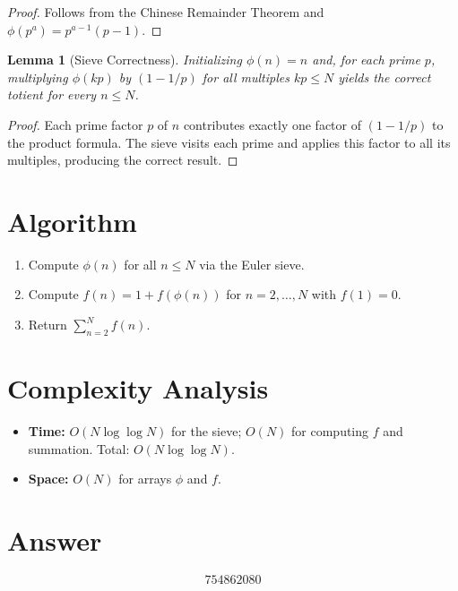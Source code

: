 \documentclass[11pt]{article}
\newtheorem{lemma}[theorem]{Lemma}
\begin{document}
\begin{proof}
Follows from the Chinese Remainder Theorem and $\phi(p^a) = p^{a-1}(p-1)$.
\end{proof}

\begin{lemma}[Sieve Correctness]
Initializing $\phi(n) = n$ and, for each prime $p$, multiplying $\phi(kp)$ by $(1 - 1/p)$ for all multiples $kp \leq N$ yields the correct totient for every $n \leq N$.
\end{lemma}

\begin{proof}
Each prime factor $p$ of $n$ contributes exactly one factor of $(1 - 1/p)$ to the product formula. The sieve visits each prime and applies this factor to all its multiples, producing the correct result.
\end{proof}

\section{Algorithm}
\begin{enumerate}
    \item Compute $\phi(n)$ for all $n \leq N$ via the Euler sieve.
    \item Compute $f(n) = 1 + f(\phi(n))$ for $n = 2, \ldots, N$ with $f(1) = 0$.
    \item Return $\sum_{n=2}^{N} f(n)$.
\end{enumerate}

\section{Complexity Analysis}
\begin{itemize}
    \item \textbf{Time:} $O(N \log\log N)$ for the sieve; $O(N)$ for computing $f$ and summation. Total: $O(N \log\log N)$.
    \item \textbf{Space:} $O(N)$ for arrays $\phi$ and $f$.
\end{itemize}

\section{Answer}

\[
\boxed{754862080}
\]
\end{document}
